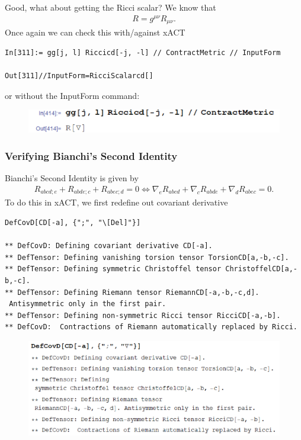 \documentclass{book}
\theoremstyle{definition}
\begin{document}
Good, what about getting the Ricci scalar? We know that
\begin{align}
R = g^{\mu\nu}R_{\mu\nu}.
\end{align}
Once again we can check this with/against xACT
\begin{lstlisting}
In[311]:= gg[j, l] Riccicd[-j, -l] // ContractMetric // InputForm

Out[311]//InputForm=RicciScalarcd[]
\end{lstlisting}
or without the InputForm command:
\begin{figure}[!htb]
	\includegraphics[scale=0.25]{ricci}
\end{figure}


\subsubsection{Verifying Bianchi's Second Identity}

Bianchi's Second Identity is given by
\begin{align}
R_{abcd;e} + R_{abde;c} + R_{abec;d} = 0 \iff
\nabla_e R_{abcd} + \nabla_c R_{abde} + \nabla_d R_{abec} = 0.
\end{align}
To do this in xACT, we first redefine out covariant derivative
\begin{lstlisting}
DefCovD[CD[-a], {";", "\[Del]"}]

** DefCovD: Defining covariant derivative CD[-a]. 
** DefTensor: Defining vanishing torsion tensor TorsionCD[a,-b,-c]. 
** DefTensor: Defining symmetric Christoffel tensor ChristoffelCD[a,-b,-c]. 
** DefTensor: Defining Riemann tensor RiemannCD[-a,-b,-c,d].
 Antisymmetric only in the first pair.
** DefTensor: Defining non-symmetric Ricci tensor RicciCD[-a,-b]. 
** DefCovD:  Contractions of Riemann automatically replaced by Ricci.
\end{lstlisting}
\begin{figure}[!htb]
	\includegraphics[scale=0.2]{covar}
\end{figure}
\end{document}
